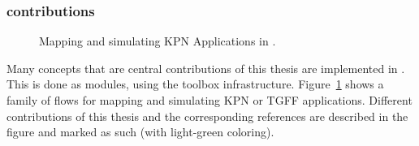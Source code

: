 \subsubsection{contributions}

\begin{figure}[h]
	\centering
   \resizebox{0.95\textwidth}{!}{}
	\caption{Mapping and simulating KPN Applications in \mocasin.}
	\label{fig:mocasin_kpn_simulation}
\end{figure}

Many concepts that are central contributions of this thesis are implemented in \mocasin. 
This is done as modules, using the \mocasin toolbox infrastructure. 
Figure~\ref{fig:mocasin_kpn_simulation} shows a family of \mocasin flows for mapping and simulating \ac{KPN} or \ac{TGFF} applications.
Different contributions of this thesis and the corresponding references are described in the figure and marked as such (with light-green coloring).
